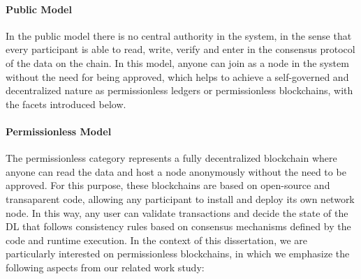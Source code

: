 \paragraph{Public Model}

In the public model there is no central authority in the system, in the sense that every participant is able to read, write, verify and enter in the consensus protocol of the data on the chain. In this model, anyone can join as a node in the system without the need for being approved, which helps to achieve a self-governed and decentralized nature as permissionless ledgers or permissionless blockchains, with the facets introduced below. %

\paragraph{Permissionless Model}

The permissionless category represents a fully decentralized blockchain where anyone can read the data and host a node anonymously without the need to be approved. For this purpose, these blockchains are based on open-source and transaparent code, allowing any participant to install and deploy its own network node. In this way, any user can validate transactions and decide the state of the \gls{DL} that follows consistency rules based on consensus mechanisms defined by the code and runtime execution. In the context of this dissertation, we are particularly interested on permissionless blockchains, in which we emphasize the following aspects from our related work study:  %

